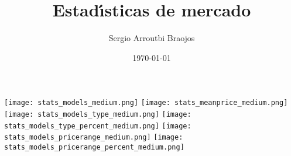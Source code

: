 \documentclass[11pt]{article}
\title{\textbf{Estad\'\i{}sticas de mercado}}
\author{Sergio Arroutbi Braojos}
\date{\today}
\begin{document}
\begin{landscape}
\texttt{[image: stats\_models\_medium.png]}
\pagebreak
\texttt{[image: stats\_meanprice\_medium.png]}
\pagebreak
\texttt{[image: stats\_models\_type\_medium.png]}
\pagebreak
\texttt{[image: stats\_models\_type\_percent\_medium.png]}
\pagebreak
\texttt{[image: stats\_models\_pricerange\_medium.png]}
\pagebreak
\texttt{[image: stats\_models\_pricerange\_percent\_medium.png]}
\end{landscape}
\end{document}
